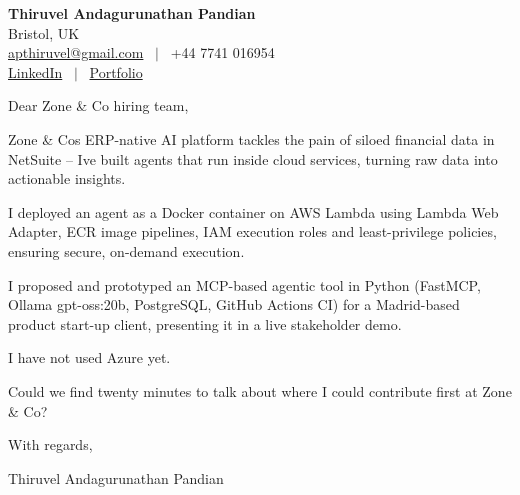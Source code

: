\documentclass[11pt,a4paper]{article}
\begin{document}
\raggedright
\pagestyle{empty}

\begin{center}
    {\LARGE \color{linkblue} \textbf{Thiruvel Andagurunathan Pandian}}\\[0.2cm]
    Bristol, UK \\
    \href{mailto:apthiruvel@gmail.com}{apthiruvel@gmail.com} \ $|$ \ +44 7741 016954 \\
\href{https://www.linkedin.com/in/thiruvel-a-p/}{LinkedIn} \ $|$ \ \href{https://thiruvel-ap.github.io/PersonalPortfolio/}{Portfolio}
\end{center}

\vspace{0.4cm}

\noindent
Dear Zone \& Co hiring team,

Zone \& Co\textquotesingle{}s ERP-native AI platform tackles the pain of siloed financial data in NetSuite – I\textquotesingle{}ve built agents that run inside cloud services, turning raw data into actionable insights.

I deployed an agent as a Docker container on AWS Lambda using Lambda Web Adapter, ECR image pipelines, IAM execution roles and least-privilege policies, ensuring secure, on-demand execution.

I proposed and prototyped an MCP-based agentic tool in Python (FastMCP, Ollama gpt-oss:20b, PostgreSQL, GitHub Actions CI) for a Madrid-based product start-up client, presenting it in a live stakeholder demo.

I have not used Azure yet.

Could we find twenty minutes to talk about where I could contribute first at Zone \& Co?

\vspace{0.5cm}

With regards,

Thiruvel Andagurunathan Pandian
\end{document}
